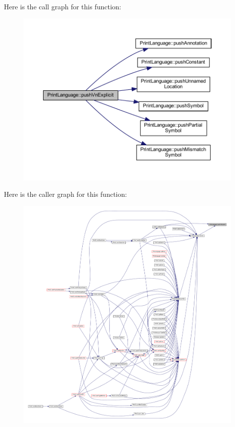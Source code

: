 Here is the call graph for this function\+:
\nopagebreak
\begin{figure}[H]
\begin{center}
\leavevmode
\includegraphics[width=350pt]{class_print_language_a6ec07b77be217d86b77ec5fec2919b08_cgraph}
\end{center}
\end{figure}
Here is the caller graph for this function\+:
\nopagebreak
\begin{figure}[H]
\begin{center}
\leavevmode
\includegraphics[width=350pt]{class_print_language_a6ec07b77be217d86b77ec5fec2919b08_icgraph}
\end{center}
\end{figure}
\mbox{\label{class_print_language_a5979bdf12bfe420ae6bba713bc3d7faf}} 
